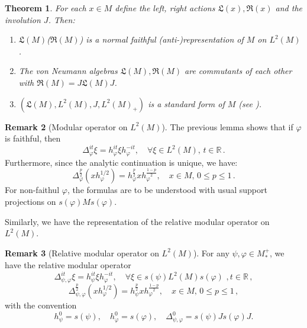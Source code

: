 \documentclass[11pt,a4paper]{article}
\theoremstyle{plain}
\newtheorem{theorem}{Theorem}
\numberwithin{theorem}{section}
\theoremstyle{definition}
\newtheorem{remark}[theorem]{Remark}
\newcommand{\?}{\overset{?}{=}}
\newcommand{\vf}{\varphi}
\begin{document}
\begin{appendix}
\begin{theorem}\label{thm:std-form-Haagerup}
    For each $x\in M$ define the left, right actions $\mathfrak L(x),\mathfrak R(x)$ and the involution $J$. Then:
    \begin{enumerate}
        \item $\mathfrak L(M)$($\mathfrak R(M)$) is a normal faithful (anti-)representation of $M$ on $L^2(M)$.
        \item The von Neumann algebras $\mathfrak L(M), \mathfrak R(M)$ are commutants of each other with $\mathfrak R(M) = J \mathfrak L(M)J$.
        \item $(\mathfrak L(M),L^2(M),J,L^2(M)_+)$ is a standard form of $M$ (see \cite{Hiai:2021cks,Hiai:2021qfv}).
    \end{enumerate}
\end{theorem}


\begin{remark}[Modular operator on $L^2(M)$]\label{rem:Modular-op-L2}
    The previous lemma shows that if $\vf$ is faithful, then
    \begin{equation}
        \Delta^{it}_\varphi \xi = h_\varphi^{it} \xi h_\varphi^{-it}, \quad \forall \xi\in L^2(M),\,t\in \mathbb R\,.
    \end{equation}
    Furthermore, since the analytic continuation is unique, we have:
    \begin{equation}\label{eq:delta-Lp-action}
        \Delta^{\frac p2}_\varphi (x h_\varphi^{1/2}) =  h_\varphi^{\frac p2} x  h_\varphi^{\frac{1-p}{2}}, \quad x \in M, \, 0\leq p\leq 1\,.
    \end{equation}
    For non-faithul $\vf$, the formulas are to be understood with usual support projections on $s(\vf)Ms(\vf)$.
\end{remark}
Similarly, we have the representation of the relative modular operator on $L^2(M)$.
\begin{remark}[Relative modular operator on $L^2(M)$]\label{rem:Relative-Modular-op-L2}
    For any $\psi,\varphi \in M_*^+$, we have the relative modular operator \cite{Hiai:2021qfv}
    \[
        \Delta_{\psi,\varphi}^{it}\xi = h_\psi^{it}\xi h_\varphi^{-it}, \quad \forall \xi\in s(\psi)L^2(M)s(\vf)\,\,, t\in \mathbb R\,,
    \]
    \[
        \Delta_{\psi,\varphi}^{\frac p2}(x h_\varphi^{1/2}) = h_\psi^{\frac{p}{2}}x h_\varphi^{\frac{1-p}{2}}, \quad x \in M, \, 0\leq p\leq 1\,,
    \]
    with the convention
    \[
        h_\psi^0=s(\psi), \quad h_\varphi^0=s(\varphi),\quad \Delta_{\psi,\varphi}^0=s(\psi)Js(\varphi)J.
    \]
\end{remark}


\end{appendix}
\end{document}
